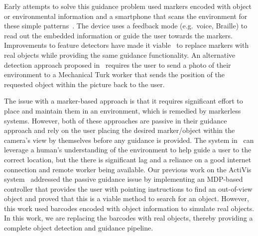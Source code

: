 \documentclass[runningheads]{llncs}
\begin{document}
Early attempts to solve this guidance problem used markers encoded with object or environmental information and a smartphone that scans the environment for these simple patterns~\cite{gude2013blind,manduchi2012mobile}. 
The device uses a feedback mode (e.g.\ voice, Braille) to read out the embedded information or guide the user towards the markers. 
Improvements to feature detectors have made it viable~\cite{redmon2016you,huang2017speed} to replace markers with real objects while providing the same guidance functionality.
An alternative detection approach proposed in~\cite{bigham2010vizwiz} requires the user to send a photo of their environment to a Mechanical Turk worker that sends the position of the requested object within the picture back to the user. 

The issue with a marker-based approach is that it requires significant effort to place and maintain them in an environment, which is remedied by markerless systems.
However, both of these approaches are passive in their guidance approach and rely on the user placing the desired marker/object within the camera's view by themselves before any guidance is provided. 
The system in~\cite{bigham2010vizwiz} can leverage a human's understanding of the environment to help guide a user to the correct location, but the there is significant lag and a reliance on a good internet connection and remote worker being available. 
Our previous work on the ActiVis system~\cite{lock2019active} addressed the passive guidance issue by implementing an MDP-based controller that provides the user with pointing instructions to find an out-of-view object and proved that this is a viable method to search for an object. 
However, this work used barcodes encoded with object information to simulate real objects.
In this work, we are replacing the barcodes with real objects, thereby providing a complete object detection and guidance pipeline. 
\end{document}
